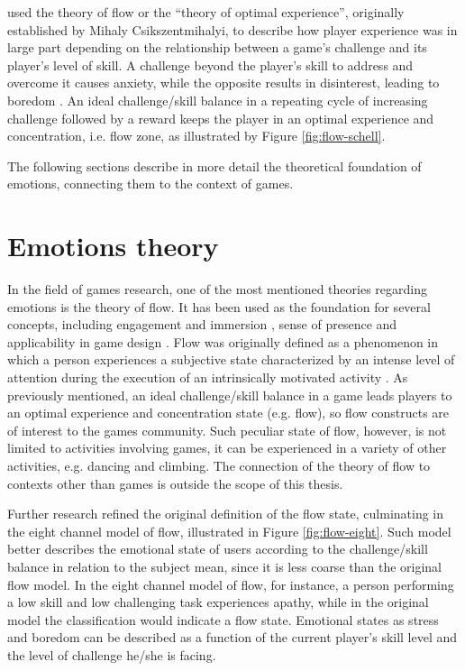 \textcite{chen2007flow} used the theory of flow or the ``theory of optimal experience'', originally established by Mihaly Csikszentmihalyi, to describe how player experience was in large part depending on the relationship between a game's challenge and its player's level of skill. A challenge beyond the player's skill to address and overcome it causes anxiety, while the opposite results in disinterest, leading to boredom \parencite{chen2007flow}. An ideal challenge/skill balance in a repeating cycle of increasing challenge followed by a reward keeps the player in an optimal experience and concentration, i.e. flow zone, as illustrated by Figure \ref{fig:flow-schell}.

The following sections describe in more detail the theoretical foundation of emotions, connecting them to the context of games.

\section{Emotions theory}

In the field of games research, one of the most mentioned theories regarding emotions is the theory of flow. It has been used as the foundation for several concepts, including engagement and immersion \parencite{brown2004grounded}, sense of presence \parencite{weibel2011immersion} and applicability in game design \parencite{sweetser2005gameflow, chen2007flow, cruz2017player}. Flow was originally defined as a phenomenon in which a person experiences a subjective state characterized by an intense level of attention during the execution of an intrinsically motivated activity \parencite{nakamura2014concept}. As previously mentioned, an ideal challenge/skill balance in a game leads players to an optimal experience and concentration state (e.g. flow), so flow constructs are of interest to the games community. Such peculiar state of flow, however, is not limited to activities involving games, it can be experienced in a variety of other activities, e.g. dancing and climbing. The connection of the theory of flow to contexts other than games is outside the scope of this thesis.

Further research \parencite{nakamura2014concept} refined the original definition of the flow state, culminating in the eight channel model of flow, illustrated in Figure \ref{fig:flow-eight}. Such model better describes the emotional state of users according to the challenge/skill balance in relation to the subject mean, since it is less coarse than the original flow model. In the eight channel model of flow, for instance, a person performing a low skill and low challenging task experiences apathy, while in the original model the classification would indicate a flow state. Emotional states as stress and boredom can be described as a function of the current player's skill level and the level of challenge he/she is facing.

